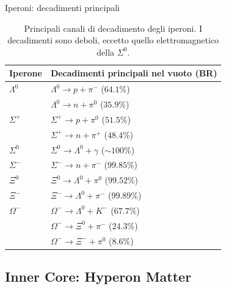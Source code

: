 \begin{frame}{Iperoni: decadimenti principali}
    \begin{table}
\centering
\scriptsize
\begin{tabular}{ll}
\hline
\textbf{Iperone} & \textbf{Decadimenti principali nel vuoto (BR)}\\
\hline
\(\Lambda^0\)
& \(\Lambda^0\to p+\pi^-\) (\(64.1\%\))\\
& \(\Lambda^0\to n+\pi^0\) (\(35.9\%\))\\
\hline
\(\Sigma^+\)
& \(\Sigma^+\to p+\pi^0\) (\(51.5\%\))\\
& \(\Sigma^+\to n+\pi^+\) (\(48.4\%\))\\

\(\Sigma^0\)
& \(\Sigma^0\to\Lambda^0+\gamma\) (\(\sim100\%\))\\

\(\Sigma^-\)
& \(\Sigma^-\to n+\pi^-\) (\(99.85\%\))\\
\hline
\(\Xi^0\)
& \(\Xi^0\to\Lambda^0+\pi^0\) (\(99.52\%\))\\

\(\Xi^-\)
& \(\Xi^-\to\Lambda^0+\pi^-\) (\(99.89\%\))\\
\hline
\(\Omega^-\)
& \(\Omega^-\to\Lambda^0+K^-\) (\(67.7\%\))\\
& \(\Omega^-\to\Xi^0+\pi^-\) (\(24.3\%\))\\
& \(\Omega^-\to\Xi^-+\pi^0\) (\(8.6\%\))\\
\hline
\end{tabular}
\caption{Principali canali di decadimento degli iperoni.
I decadimenti sono deboli, eccetto quello
elettromagnetico della \(\Sigma^0\).}
\end{table}
\end{frame}

\subsection{Inner Core: Hyperon Matter}

